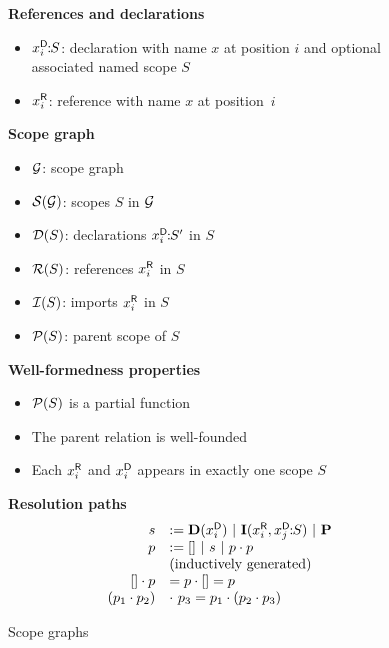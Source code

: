 \begin{figure}[p]

\begin{minipage}[t]{.49\hsize}
\begin{boxedminipage}[t]{\hsize}
\textbf{References and declarations}
\begin{itemize}
  \item $\mbox{$\dsi{x}{i}{S}$}$: declaration with name $x$ at position $i$ and optional
  associated named scope $S$
  \item $\ri{x}{i}$: reference with name $x$ 
  at position~$i$ 
\end{itemize}
\textbf{Scope graph}
\begin{itemize}
  \item $\G$: scope graph
  \item $\S{\G}$: scopes $S$ in $\G$ 
  \item $\D{S}$: declarations $\dsi{x}{i}{S'}$ in $S$
  \item $\R{S}$: references $\ri{x}{i}$ in $S$
  \item $\I{S}$: imports $\ri{x}{i}$ in $S$
  \item $\P{S}$: parent scope of $S$
\end{itemize}
\textbf{Well-formedness properties}
\begin{itemize}
  \item $\P{S}$ is a partial function
  \item The parent relation is well-founded
  \item Each $\ri{x}{i}$ and $\di{x}{i}$ appears in exactly one scope $S$
\end{itemize}
\end{boxedminipage}
\caption{Scope graphs}
\end{minipage}
\begin{minipage}[t]{.49\hsize}
\begin{boxedminipage}[t]{\hsize}
\textbf{Resolution paths}
\vspace*{-0.4\baselineskip}
$$\begin{array}{rl}
          s & := \dstep{\di{x}{i}}\ |\ \istep{\ri{x}{i}}{\dsi{x}{j}{S}}\ |\ \pstep\\
          p & := []\ |\ s\ |\ p\cdot p\\
          & \mbox{\rm (inductively generated)} \\[0pt]
          [] \cdot p & = p \cdot [] = p\\
          (p_1 \cdot p_2) &\cdot\ p_3  = p_1 \cdot (p_2 \cdot p_3)
\end{array}$$ 


\end{boxedminipage}
\end{minipage}
\end{figure}
